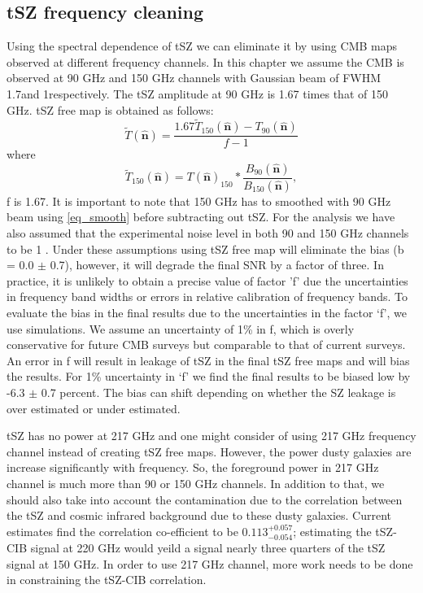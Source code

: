 \subsection{tSZ frequency cleaning}
 Using the spectral dependence of tSZ we can eliminate it by using CMB maps observed at different frequency channels.
 In this chapter we assume the CMB is observed at 90 GHz and 150 GHz channels with Gaussian beam of FWHM 1.7\am and 1\am respectively.
 The tSZ amplitude at 90 GHz is 1.67 times that of 150 GHz.
 tSZ free map is obtained as follows:
 \begin{equation}
\widetilde{T}(\hat{\textbf{n}})  =  \frac{1.67\widetilde{T}_{{150}}(\hat{\textbf{n}}) - T_{{90}}(\hat{\textbf{n}})}{f-1}
\end{equation}
where
\begin{equation}
\widetilde{T}_{{150}}(\hat{\textbf{n}})  =  T(\hat{\textbf{n}})_{{150}} \ast \frac{B_{{90}}(\hat{\textbf{n}})}{B_{{150}}(\hat{\textbf{n}})},
\label{eq_smooth}
\end{equation}
 f is 1.67. It is important to note that 150 GHz has to smoothed with 90 GHz beam using \ref{eq_smooth} before subtracting out tSZ.
  For the analysis we have also assumed that the experimental noise level in both 90 and 150 GHz channels to be 1 \ukam. 
  Under these assumptions using tSZ free map will eliminate the bias (b = 0.0 $\pm$ 0.7), however, it will degrade the final SNR by a factor of three.
  In practice, it is unlikely to obtain a precise value of factor 'f' due the uncertainties in frequency band widths or errors in relative calibration of frequency bands.
  To evaluate the bias in the final results due to the uncertainties in the factor `f', we use simulations. 
  We assume an uncertainty of 1\% in f, which is overly conservative for future CMB surveys but comparable to that of current surveys.
 An error in f will result in leakage of tSZ in the final tSZ free maps and will bias the results.
 For 1\% uncertainty in `f' we find the final results to be biased low by -6.3 $\pm$ 0.7 percent. 
 The bias can shift depending on whether the SZ leakage is over estimated or under estimated.
  
tSZ has no power at 217 GHz and one might consider of using 217 GHz frequency channel instead of creating tSZ free maps. 
However, the power dusty galaxies are increase significantly with frequency.
So, the foreground power in 217 GHz channel is much more than 90 or 150 GHz channels. 
In addition to that, we should also take into account the contamination due to the correlation between the tSZ and cosmic infrared background due to these dusty galaxies.
 Current estimates find the correlation co-efficient to be $0.113^{+0.057}_{-0.054}$; estimating the tSZ-CIB signal at 220 GHz would yeild a signal nearly three quarters of the tSZ signal at 150 GHz. 
 In order to use 217 GHz channel, more work needs to be done in constraining the tSZ-CIB correlation.
 

